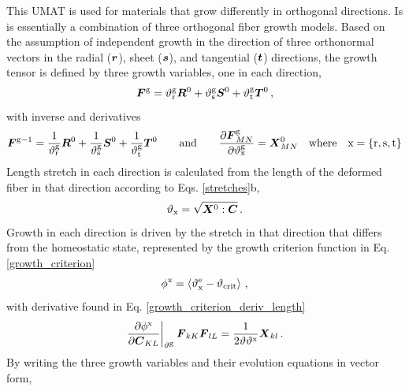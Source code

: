 \documentclass[10pt,letterpaper,oneside]{report}
\newcommand{\sca}[1]{\mbox{\rm{#1}}{}} %
\newcommand{\ten}[1]{\mbox{\boldmath $#1$}{}}
\newcommand{\scas}[1]{\mbox{{\scriptsize{${\rm{#1}}$}}}{}}
\begin{document}
This UMAT is used for materials that grow differently in orthogonal directions.  Is is essentially a combination of three orthogonal fiber growth models.  Based on the assumption of independent growth in the direction of three orthonormal vectors in the radial ($\ten{r}$), sheet ($\ten{s}$), and tangential ($\ten{t}$) directions, the growth tensor is defined by three growth variables, one in each direction,
\begin{equation}
\ten{F}^{\scas{g}} = \vartheta^{\scas{g}}_{\scas{r}}  \ten{R}^0 + \vartheta^{\scas{g}}_{\scas{s}} \ten{S}^0 + \vartheta^{\scas{g}}_{\scas{t}} \ten{T}^0 \, , 
\end{equation}
with inverse and derivatives 
\begin{equation}
\ten{F}^{\scas{g}-1} = \frac{1}{\vartheta^{\scas{g}}_{\scas{r}}}  \ten{R}^0 + \frac{1}{\vartheta^{\scas{g}}_{\scas{s}}} \ten{S}^0 + \frac{1}{\vartheta^{\scas{g}}_{\scas{t}}} \ten{T}^0 
\qquad \mbox{and} \qquad
\frac{\partial \ten{F}^{\scas{g}}_{MN} }{\partial \vartheta^{\scas{g}}_{\scas{x}} } = \ten{X}^0_{MN} 
\quad \mbox{where} \quad
\sca{x} = \lbrace \sca{r}, \sca{s}, \sca{t} \rbrace
\end{equation}
Length stretch in each direction is calculated from the length of the deformed fiber in that direction according to Eqs. \ref{stretches}b, 
\begin{equation*}
\vartheta_{\scas{x}} = \sqrt{ \ten{X}^0 : \ten{C} } \, .
\end{equation*}
Growth in each direction is driven by the stretch in that direction that differs from the homeostatic state, represented by the growth criterion function in Eq. \ref{growth_criterion}
\begin{equation*}
\phi^{\scas{x}} = \left\langle \vartheta^{\scas{e}}_{\scas{x}} - \vartheta_{\scas{crit}} \right\rangle \, ,
\end{equation*}
with derivative found in Eq. \ref{growth_criterion_deriv_length}
\begin{equation*}
\left. \frac{ \partial \phi^{\scas{x}} }{ \partial \ten{C}_{KL} } \right|_{\vartheta^{\scas{g}}} \ten{F}_{kK} \ten{F}_{lL} 
= \frac{1}{2 \vartheta \vartheta^{\scas{x}}} \ten{X}_{kl} \, . 
\end{equation*}
By writing the three growth variables and their evolution equations in vector form, 
\end{document}

